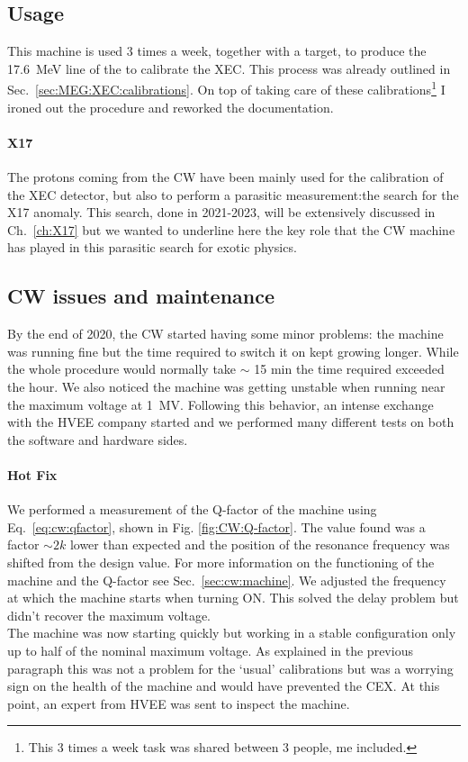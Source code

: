 \begin{refsection}
    \subsection{Usage}
        This machine is used 3 times a week, together with a  target, to produce the \SI{17.6}{MeV} line of the  to calibrate the XEC. 
        This process was already outlined in Sec.~\ref{sec:MEG:XEC:calibrations}.
        On top of taking care of these calibrations\footnote{This 3 times a week task was shared between 3 people, me included.} I ironed out the procedure and reworked the documentation.
        
        \paragraph{X17} The protons coming from the CW have been mainly used for the calibration of the XEC detector, but also to perform a parasitic measurement:the search for the X17 anomaly.
        This search, done in 2021-2023, will be extensively discussed in Ch.~\ref{ch:X17} but we wanted to underline here the key role that the CW machine has played in this parasitic search for exotic physics. 

    \subsection{CW issues and maintenance}
        By the end of 2020, the CW started having some minor problems: the machine was running fine but the time required to switch it on kept growing longer. 
        While the whole procedure would normally take $\sim$ 15 min the time required exceeded the hour.
        We also noticed the machine was getting unstable when running near the maximum voltage at \SI{1}{MV}.
        Following this behavior, an intense exchange with the HVEE company started and we performed many different tests on both the software and hardware sides.
    
        \paragraph{Hot Fix}
        We performed a measurement of the Q-factor of the machine using Eq.~\ref{eq:cw:qfactor}, shown in Fig. \ref{fig:CW:Q-factor}.  
        The value found was a factor $\sim2k$ lower than expected and the position of the resonance frequency was shifted from the design value.
        For more information on the functioning of the machine and the Q-factor see Sec.~\ref{sec:cw:machine}.
        We adjusted the frequency at which the machine starts when turning ON. 
        This solved the delay problem but didn't recover the maximum voltage. \\
        The machine was now starting quickly but working in a stable configuration only up to half of the nominal maximum voltage.
        As explained in the previous paragraph this was not a problem for the `usual' calibrations but was a worrying sign on the health of the machine and would have prevented the CEX.
        At this point, an expert from HVEE was sent to inspect the machine.


\end{refsection}
